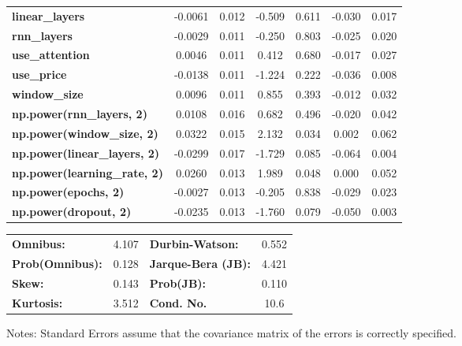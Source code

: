 \begin{center}
\begin{tabular}{lcccccc}
\textbf{linear\_layers}              &      -0.0061  &        0.012     &    -0.509  &         0.611        &       -0.030    &        0.017     \\
\textbf{rnn\_layers}                 &      -0.0029  &        0.011     &    -0.250  &         0.803        &       -0.025    &        0.020     \\
\textbf{use\_attention}              &       0.0046  &        0.011     &     0.412  &         0.680        &       -0.017    &        0.027     \\
\textbf{use\_price}                  &      -0.0138  &        0.011     &    -1.224  &         0.222        &       -0.036    &        0.008     \\
\textbf{window\_size}                &       0.0096  &        0.011     &     0.855  &         0.393        &       -0.012    &        0.032     \\
\textbf{np.power(rnn\_layers, 2)}    &       0.0108  &        0.016     &     0.682  &         0.496        &       -0.020    &        0.042     \\
\textbf{np.power(window\_size, 2)}   &       0.0322  &        0.015     &     2.132  &         0.034        &        0.002    &        0.062     \\
\textbf{np.power(linear\_layers, 2)} &      -0.0299  &        0.017     &    -1.729  &         0.085        &       -0.064    &        0.004     \\
\textbf{np.power(learning\_rate, 2)} &       0.0260  &        0.013     &     1.989  &         0.048        &        0.000    &        0.052     \\
\textbf{np.power(epochs, 2)}         &      -0.0027  &        0.013     &    -0.205  &         0.838        &       -0.029    &        0.023     \\
\textbf{np.power(dropout, 2)}        &      -0.0235  &        0.013     &    -1.760  &         0.079        &       -0.050    &        0.003     \\
\bottomrule
\end{tabular}
\begin{tabular}{lclc}
\textbf{Omnibus:}       &  4.107 & \textbf{  Durbin-Watson:     } &    0.552  \\
\textbf{Prob(Omnibus):} &  0.128 & \textbf{  Jarque-Bera (JB):  } &    4.421  \\
\textbf{Skew:}          &  0.143 & \textbf{  Prob(JB):          } &    0.110  \\
\textbf{Kurtosis:}      &  3.512 & \textbf{  Cond. No.          } &     10.6  \\
\bottomrule
\end{tabular}
\end{center}

Notes: \newline
 [1] Standard Errors assume that the covariance matrix of the errors is correctly specified.